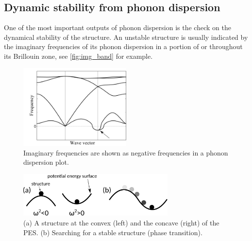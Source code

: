 \subsection{Dynamic stability from phonon dispersion}

One of the most important outputs of phonon dispersion is the check on the dynamical stability of the structure. An unstable structure is usually indicated by the imaginary frequencies of its phonon dispersion in a portion of or throughout its Brillouin zone, see \autoref{fig:img_band} for example. 


\begin{figure}[htbp!] 
\centering  
\includegraphics[width=0.5\textwidth]{img_band.png}
\caption{ Imaginary frequencies are shown as negative frequencies in a phonon dispersion plot.}  
\label{fig:img_band}
\end{figure} 

\begin{figure}[htbp!] 
\centering  
\includegraphics[width=0.7\textwidth]{fre_ima.eps}
\caption{ (a) A structure at the convex (left) and the concave (right) of the PES. (b) Searching for a stable structure (phase transition).}  
\label{fig:fre_ima}
\end{figure} 

